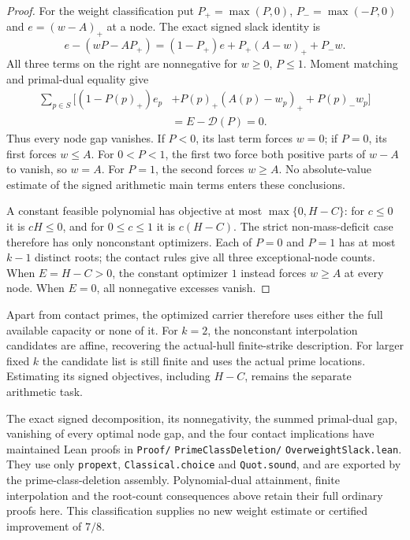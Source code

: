 \documentclass[11pt]{article}
\theoremstyle{definition}
\begin{document}
\begin{proof}
For the weight classification put $P_+=\max(P,0)$,
$P_-=\max(-P,0)$ and $e=(w-A)_+$ at a node.
The exact signed slack identity is
\begin{equation}
 e-(wP-A P_+)=(1-P_+)e+P_+(A-w)_++P_-w.
 \label{eq:overweight-three-signed-slacks}
\end{equation}
All three terms on the right are nonnegative for $w\ge0$,
$P\le1$. Moment matching and primal-dual equality give
\begin{equation}
 \begin{aligned}
 \sum_{p\in S}\bigl[(1-P(p)_+)e_p
        &+P(p)_+(A(p)-w_p)_++P(p)_-w_p\bigr]\\
        &=E-\mathcal D(P)=0.
 \end{aligned}
 \label{eq:zero-total-prime-contact-slack}
\end{equation}
Thus every node gap vanishes. If $P<0$, its last term
forces $w=0$; if $P=0$, its first forces $w\le A$.
For $0<P<1$, the first two force both positive parts
of $w-A$ to vanish, so $w=A$.
For $P=1$, the second forces $w\ge A$.
No absolute-value estimate of the signed arithmetic
main terms enters these conclusions.

A constant feasible polynomial has objective at most
$\max\{0,H-C\}$: for $c\le0$ it is $cH\le0$,
and for $0\le c\le1$ it is $c(H-C)$.
The strict non-mass-deficit case therefore has only
nonconstant optimizers. Each of $P=0$ and $P=1$ has
at most $k-1$ distinct roots; the contact rules give
all three exceptional-node counts.
When $E=H-C>0$, the constant optimizer $1$ instead
forces $w\ge A$ at every node.
When $E=0$, all nonnegative excesses vanish.
\end{proof}

Apart from contact primes, the optimized carrier therefore
uses either the full available capacity or none of it.
For $k=2$, the nonconstant interpolation candidates are
affine, recovering the actual-hull finite-strike description.
For larger fixed $k$ the candidate list is still finite
and uses the actual prime locations.
Estimating its signed objectives, including $H-C$, remains
the separate arithmetic task.

The exact signed decomposition, its nonnegativity, the
summed primal-dual gap, vanishing of every optimal node
gap, and the four contact implications have maintained
Lean proofs in
\texttt{Proof/}\allowbreak
\texttt{PrimeClassDeletion/}\allowbreak
\texttt{OverweightSlack.lean}.
They use only \texttt{propext}, \texttt{Classical.choice}
and \texttt{Quot.sound}, and are exported by the
prime-class-deletion assembly.
Polynomial-dual attainment, finite interpolation and
the root-count consequences above retain their full
ordinary proofs here. This classification supplies
no new weight estimate or certified improvement of $7/8$.
\end{document}
